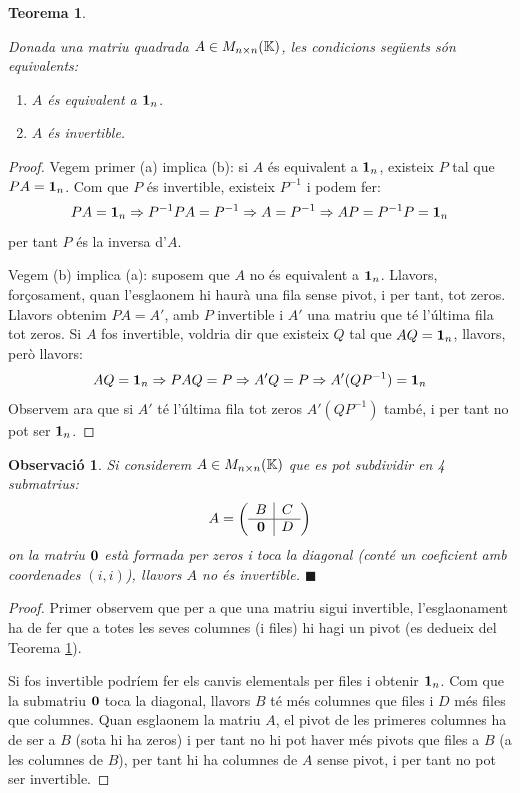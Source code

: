 \documentclass[
  11pt,
]{book}
\numberwithin{dummy}{section}
\theoremstyle{maincolornumbox}
\newtheorem{theorem}{TTTT}[chapter]
\newtheorem{theoremeT}{Teorema}[chapter]
\newtheorem{remarkT}{Observació}[chapter]
\theoremstyle{blacknumex}
\theoremstyle{blacknumbox}
\theoremstyle{maincolornum}
\renewenvironment{theorem}{\begin{tBox}\begin{theoremeT}}{\end{theoremeT}\end{tBox}}
\newenvironment{remark}{\begin{remarkT}}{\hfill{\tiny\ensuremath{\blacksquare}}\end{remarkT}}
\begin{document}
\begin{theorem}
\protect\hypertarget{thm:critinv}{}\label{thm:critinv}

Donada una matriu quadrada
\(A \in M_{n\times n}(\mathbb{K})\), les condicions següents són equivalents:

\begin{enumerate}
\def\labelenumi{\arabic{enumi}.}
\item
  \(A\) és equivalent a \(\mathbf{1}_n\).
\item
  \(A\) és invertible.
\end{enumerate}

\end{theorem}

\begin{proof}
Vegem primer (a) implica (b): si \(A\) és equivalent a \(\mathbf{1}_n\),
existeix \(P\) tal que \(PA=\mathbf{1}_n\). Com que \(P\) és invertible, existeix
\(P^{-1}\) i podem fer:
\[PA=\mathbf{1}_n \Rightarrow P ^{-1}PA=P^{-1} \Rightarrow A=P^{-1} \Rightarrow AP = P^{-1}P=\mathbf{1}_n\]
per tant \(P\) és la inversa d'\(A\).

Vegem (b) implica (a): suposem que \(A\) no és equivalent a \(\mathbf{1}_n\).
Llavors, forçosament, quan l'esglaonem hi haurà una fila sense pivot, i
per tant, tot zeros. Llavors obtenim \(PA=A'\), amb \(P\) invertible i \(A'\)
una matriu que té l'última fila tot zeros. Si \(A\) fos invertible,
voldria dir que existeix \(Q\) tal que \(AQ=\mathbf{1}_n\), llavors, però llavors:
\[AQ=\mathbf{1}_n \Rightarrow PAQ=P \Rightarrow A'Q=P \Rightarrow A'(QP^{-1})=\mathbf{1}_n\]
Observem ara que si \(A'\) té l'última fila tot zeros \(A'(QP^{-1})\) també,
i per tant no pot ser \(\mathbf{1}_n\).
\end{proof}

\begin{remark}
Si considerem \(A \in M_{n\times n}(\mathbb{K})\)
que es pot subdividir en 4 submatrius: \[A=\left(\begin{array}{c|c}
    B & C \\ \hline \mathbf{0} & D
    \end{array}\right)\] on la matriu \(\mathbf{0}\) està formada per zeros i toca la
diagonal (conté un coeficient amb coordenades \((i,i)\)), llavors \(A\) no
és invertible.
\end{remark}

\begin{proof}
Primer observem que per a que una matriu sigui invertible,
l'esglaonament ha de fer que a totes les seves columnes (i files) hi
hagi un pivot (es dedueix del Teorema
\ref{thm:critinv}).

Si fos invertible podríem fer els canvis elementals per files i obtenir
\(\mathbf{1}_n\). Com que la submatriu \(\mathbf{0}\) toca la diagonal, llavors \(B\) té més
columnes que files i \(D\) més files que columnes. Quan esglaonem la
matriu \(A\), el pivot de les primeres columnes ha de ser a \(B\) (sota hi
ha zeros) i per tant no hi pot haver més pivots que files a \(B\) (a les
columnes de \(B\)), per tant hi ha columnes de \(A\) sense pivot, i per tant
no pot ser invertible.
\end{proof}
\end{document}
